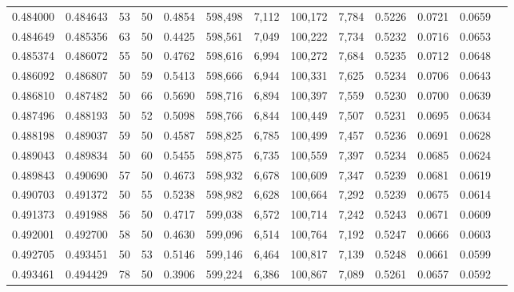 \begin{tabular}{rrrrrrrrrrrrr}
0.484000 & 0.484643 &    53 &  50 &                                     0.4854 & 598,498 &   7,112 & 100,172 &   7,784 & 0.5226 & 0.0721 & 0.0659 \\
0.484649 & 0.485356 &    63 &  50 &                                     0.4425 & 598,561 &   7,049 & 100,222 &   7,734 & 0.5232 & 0.0716 & 0.0653 \\
0.485374 & 0.486072 &    55 &  50 &                                     0.4762 & 598,616 &   6,994 & 100,272 &   7,684 & 0.5235 & 0.0712 & 0.0648 \\
0.486092 & 0.486807 &    50 &  59 &                                     0.5413 & 598,666 &   6,944 & 100,331 &   7,625 & 0.5234 & 0.0706 & 0.0643 \\
0.486810 & 0.487482 &    50 &  66 &                                     0.5690 & 598,716 &   6,894 & 100,397 &   7,559 & 0.5230 & 0.0700 & 0.0639 \\
0.487496 & 0.488193 &    50 &  52 &                                     0.5098 & 598,766 &   6,844 & 100,449 &   7,507 & 0.5231 & 0.0695 & 0.0634 \\
0.488198 & 0.489037 &    59 &  50 &                                     0.4587 & 598,825 &   6,785 & 100,499 &   7,457 & 0.5236 & 0.0691 & 0.0628 \\
0.489043 & 0.489834 &    50 &  60 &                                     0.5455 & 598,875 &   6,735 & 100,559 &   7,397 & 0.5234 & 0.0685 & 0.0624 \\
0.489843 & 0.490690 &    57 &  50 &                                     0.4673 & 598,932 &   6,678 & 100,609 &   7,347 & 0.5239 & 0.0681 & 0.0619 \\
0.490703 & 0.491372 &    50 &  55 &                                     0.5238 & 598,982 &   6,628 & 100,664 &   7,292 & 0.5239 & 0.0675 & 0.0614 \\
0.491373 & 0.491988 &    56 &  50 &                                     0.4717 & 599,038 &   6,572 & 100,714 &   7,242 & 0.5243 & 0.0671 & 0.0609 \\
0.492001 & 0.492700 &    58 &  50 &                                     0.4630 & 599,096 &   6,514 & 100,764 &   7,192 & 0.5247 & 0.0666 & 0.0603 \\
0.492705 & 0.493451 &    50 &  53 &                                     0.5146 & 599,146 &   6,464 & 100,817 &   7,139 & 0.5248 & 0.0661 & 0.0599 \\
0.493461 & 0.494429 &    78 &  50 &                                     0.3906 & 599,224 &   6,386 & 100,867 &   7,089 & 0.5261 & 0.0657 & 0.0592 \\

\end{tabular}
